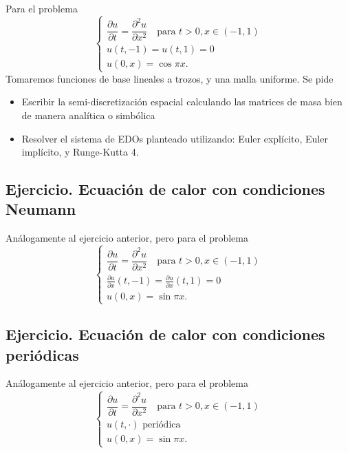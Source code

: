 Para el problema \[
    \begin{cases}
        \dfrac{\partial u}{\partial t} = \dfrac{\partial^2 u}{\partial x^2} \quad  \text{para } t > 0, x \in (-1,1) \\ u (t, -1) = u (t, 1) = 0 \\
        u(0,x) = \cos \pi x.
    \end{cases}
\] Tomaremos funciones de base lineales a trozos, y una malla uniforme.
Se pide

\begin{itemize}
    \item
          Escribir la semi-discretización espacial calculando las matrices de
          masa bien de manera analítica o simbólica
    \item
          Resolver el sistema de EDOs planteado utilizando: Euler explícito,
          Euler implícito, y Runge-Kutta 4.
\end{itemize}

\subsection{Ejercicio. Ecuación de calor con condiciones
    Neumann}\label{ejercicio-ecuaciuxf3n-de-calor-con-condiciones-neumann}

Análogamente al ejercicio anterior, pero para el problema \[
    \begin{cases}
        \dfrac{\partial u}{\partial t} = \dfrac{\partial^2 u}{\partial x^2} \quad  \text{para } t > 0, x \in (-1,1) \\
        \frac{\partial u}{\partial x} (t, -1) = \frac{\partial u}{\partial x} (t, 1) = 0                            \\
        u(0,x) = \sin \pi x.
    \end{cases}
\]

\subsection{Ejercicio. Ecuación de calor con condiciones
    periódicas}\label{ejercicio-ecuaciuxf3n-de-calor-con-condiciones-periuxf3dicas}

Análogamente al ejercicio anterior, pero para el problema \[
    \begin{cases}
        \dfrac{\partial u}{\partial t} = \dfrac{\partial^2 u}{\partial x^2} \quad  \text{para } t > 0, x \in (-1,1) \\
        u(t, \cdot) \text{ periódica}                                                                               \\
        u(0,x) = \sin \pi x.
    \end{cases}
\]

